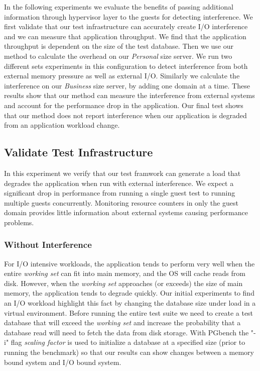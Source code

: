In the following experiments we evaluate the benefits of passing additional information through hypervisor layer to the  guests for detecting interference.  We first validate that our test infrastructure can accurately create I/O interference and we can measure that application throughput.  We find that the application throughput is dependent on the size of the test database.  Then we use our method to calculate the overhead on our \emph{Personal} size server.  We run two different sets experiments in this configuration to detect interference from both external memory pressure as well as external I/O.   Similarly we calculate the interference on our \emph{Business} size server, by adding one domain at a time.  These results show that our method can measure the interference from external systems and account for the performance drop in the application.  Our final test shows that our method does not report interference when our application is degraded from an application workload change.

\subsection{Validate Test Infrastructure}
In this experiment we verify that our test framwork can generate a load that degrades the application when run with external interference.  We expect a significant drop in performance from running a single guest test to running multiple guests concurrently.  Monitoring resource counters in only the guest domain provides little information about external systems causing performance problems. 

\subsubsection{Without Interference}
For I/O intensive workloads, the application tends to perform very well when the entire \emph{working set} can fit into main memory, and the OS will cache reads from disk.  However, when the \emph{working set}  approaches (or exceeds) the size of main memory, the application tends to degrade quickly.  Our initial experiments to find an I/O workload highlight this fact by changing the database size under load in a virtual environment.  Before running the entire test suite we need to create a test database that will exceed the \emph{working set} and increase the probability that a database read will need to fetch the data from disk storage.  With PGbench the "-i" flag \emph{scaling factor} is used to initialize a database at a specified size (prior to running the benchmark) so that our results can show changes between a memory bound system and I/O bound system.  

